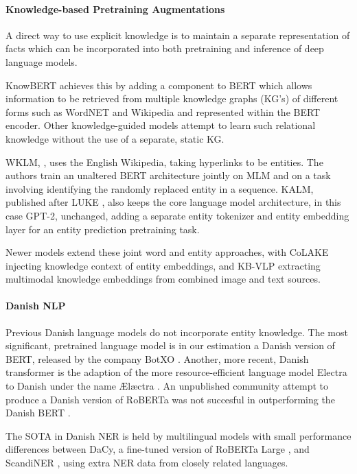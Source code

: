 \documentclass[10pt, a4paper]{article}
\begin{document}
\paragraph{Knowledge-based Pretraining Augmentations}
A direct way to use explicit knowledge is to maintain a separate representation of facts which can be incorporated into both pretraining and inference of deep language models.

KnowBERT \cite{peters2019knowbert} achieves this by adding a component to BERT which allows information to be retrieved from multiple knowledge graphs (KG's) of different forms such as WordNET and Wikipedia and represented within the BERT encoder.
Other knowledge-guided models attempt to learn such relational knowledge without the use of a separate, static KG.
{WKLM, \cite{xiong2019wklm}, uses the English Wikipedia, taking hyperlinks to be entities.
The authors train an unaltered BERT architecture jointly on MLM and on a task involving identifying the randomly replaced entity in a sequence.
KALM, published after LUKE \cite{corby2020kalm}, also keeps the core language model architecture, in this case GPT-2, unchanged, adding a separate entity tokenizer and entity embedding layer for an entity prediction pretraining task.

Newer models extend these joint word and entity approaches, with CoLAKE \cite{sun2020colake} injecting knowledge context of entity embeddings, and KB-VLP \cite{chen2021kb-vlp} extracting multimodal knowledge embeddings from combined image and text sources.

\paragraph{Danish NLP}
Previous Danish language models do not incorporate entity knowledge.
The most significant, pretrained language model is in our estimation a Danish version of BERT, released by the company BotXO \cite{botxo2019dabert}.
Another, more recent, Danish transformer is the adaption of the more resource-efficient language model Electra to Danish under the name Ælæctra \cite{bertelsen2020lctra}.
An unpublished community attempt to produce a Danish version of RoBERTa was not succesful in outperforming the Danish BERT \cite{boye2021ing}.

The SOTA in Danish NER is held by multilingual models \cite{danlp2021} with small performance differences between DaCy, a fine-tuned version of RoBERTa Large \cite{enevoldsen2020dacy}, and ScandiNER \cite{nielsen2021scandi}, using extra NER data from closely related languages.

}
\end{document}
